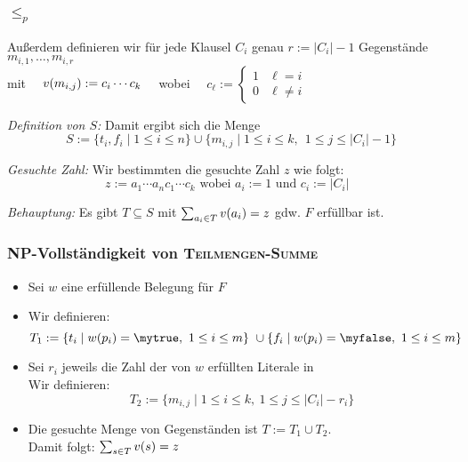 \documentclass[aspectratio=1610,onlymath]{beamer}
\begin{document}
\begin{frame}
  \frametitle{ $\leq_p$ }

  Außerdem definieren wir für jede Klausel $C_i$ genau $r := |C_i|-1$ Gegenstände
  $m_{i,1}, \ldots, m_{i,r}$\\[5pt]
  mit $\quad v(m_{i, j}) := c_i \cdots c_k\quad$ wobei
  $\quad
  c_\ell :=
  \begin{cases}
    1 & \ell=i\\
    0 & \ell\not= i
  \end{cases}
  $\bigskip\pause

  \emph{Definition von $S$: } Damit ergibt sich die Menge
  \[
     S := \{ t_i, f_i \mid 1\leq i \leq
       n\} \cup \{ m_{i,j} \mid 1\leq i\leq k,~~ 1\leq j \leq |C_i|-1\}
  \]

  \pause\emph{Gesuchte Zahl: } Wir bestimmten die gesuchte Zahl $z$ wie folgt:\\
  \[
     \text{$z := a_1 \cdots a_n c_1 \cdots c_k$ wobei $a_i := 1$ und $c_i := |C_i|$ }
  \]

  \bigskip

  \pause\emph{Behauptung: } Es gibt $T\subseteq S$ mit $\sum_{a_i\in T}
    v(a_i) = z$ gdw. $F$ erfüllbar ist.
\end{frame}


\begin{frame}\frametitle{NP-Vollständigkeit von \textsc{Teilmengen-Summe}}

\bigskip

%
\pause
\begin{itemize}
\item Sei $w$ eine erfüllende Belegung für $F$\pause\\[2ex]
%
\item Wir definieren: 
    \[T_1 :=
		\{ t_i \mid w(p_i) = \mytrue,~ 1\leq i \leq m\}\
			\cup \{ f_i \mid w(p_i) = \myfalse,~ 1\leq i \leq m\}
    \]\pause%
\item Sei $r_i$ jeweils die Zahl der von $w$ erfüllten Literale in \\
Wir definieren:
\[T_2 := \{ m_{i,j}\mid 1\leq i \leq k,~ 1\leq j \leq |C_i|-r_i \}\]\pause%
% 
\item Die gesuchte Menge von Gegenständen ist $T := T_1 \cup T_2$.\\[5pt]
Damit folgt: $\sum_{s\in T} v(s) = z$
\end{itemize}
\end{frame}
\end{document}
